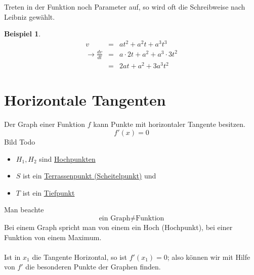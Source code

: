 \documentclass[a4paper,10pt]{report}
\newtheorem{myexample}{Beispiel}
\begin{document}
\noindent
Treten in der Funktion noch Parameter auf, so wird oft die Schreibweise nach Leibniz gewählt.
\begin{myexample}
	\begin{eqnarray*}
		v &=& at^2 + a^2t + a^3t^3\\
		\to \frac{dv}{dt} &=& a \cdot 2t + a^2 + a^3 \cdot 3t^2\\
		&=& 2at + a^2 + 3a^3t^2
	\end{eqnarray*}
\end{myexample}
\newpage
\section{Horizontale Tangenten}
Der Graph einer Funktion $f$ kann Punkte mit horizontaler Tangente besitzen.
\begin{equation*}f'(x)=0\end{equation*}
Bild Todo\\
\begin{itemize}
\item $H_1, H_2$ sind \underline{Hochpunkten} 
\item $S$ ist ein \underline{Terrassenpunkt (Scheitelpunkt)} und
\item $T$ ist ein \underline{Tiefpunkt} 
\end{itemize}
Man beachte
\begin{equation*}\text{ein Graph} \not = \text{Funktion}\end{equation*}
Bei einem Graph spricht man von einem ein Hoch (Hochpunkt), bei einer Funktion von einem Maximum.\\
\\
Ist in $x_1$ die Tangente Horizontal, so ist $f'(x_1) = 0$; also können wir mit Hilfe von $f'$ die besonderen Punkte der Graphen finden.
\end{document}
